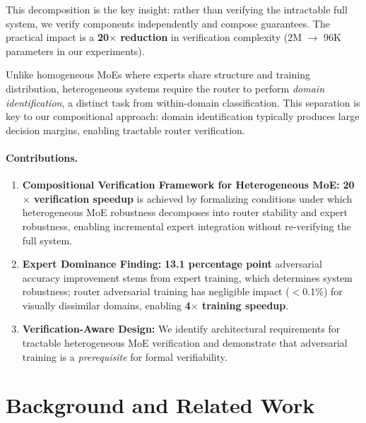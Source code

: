 \documentclass{article}
\theoremstyle{plain}
\theoremstyle{remark}
\begin{document}
This decomposition is the key insight: rather than verifying the intractable full system, we verify components independently and compose guarantees. The practical impact is a \textbf{20$\times$ reduction} in verification complexity (2M $\to$ 96K parameters in our experiments).

Unlike homogeneous MoEs where experts share structure and training distribution, heterogeneous systems require the router to perform \textit{domain identification}, a distinct task from within-domain classification. This separation is key to our compositional approach: domain identification typically produces large decision margins, enabling tractable router verification.

\paragraph{Contributions.}
\begin{enumerate}
    \item \textbf{Compositional Verification Framework for Heterogeneous MoE:} \textbf{20$\times$ verification speedup} is achieved by formalizing conditions under which heterogeneous MoE robustness decomposes into router stability and expert robustness, enabling incremental expert integration without re-verifying the full system.

    \item \textbf{Expert Dominance Finding:} \textbf{13.1 percentage point} adversarial accuracy improvement stems from expert training, which determines system robustness; router adversarial training has negligible impact ($<$0.1\%) for visually dissimilar domains, enabling \textbf{4$\times$ training speedup}.

    \item \textbf{Verification-Aware Design:} We identify architectural requirements for tractable heterogeneous MoE verification and demonstrate that adversarial training is a \textit{prerequisite} for formal verifiability.
\end{enumerate}

\section{Background and Related Work}
\end{document}
